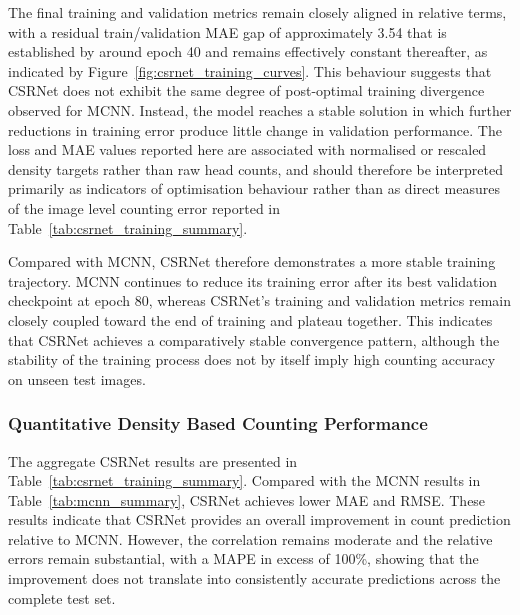 The final training and validation metrics remain closely aligned in relative terms, with a residual train/validation MAE gap of approximately 3.54 that is established by around epoch 40 and remains effectively constant thereafter, as indicated by Figure~\ref{fig:csrnet_training_curves}. This behaviour suggests that CSRNet does not exhibit the same degree of post-optimal training divergence observed for MCNN. Instead, the model reaches a stable solution in which further reductions in training error produce little change in validation performance. The loss and MAE values reported here are associated with normalised or rescaled density targets rather than raw head counts, and should therefore be interpreted primarily as indicators of optimisation behaviour rather than as direct measures of the image level counting error reported in Table~\ref{tab:csrnet_training_summary}.

Compared with MCNN, CSRNet therefore demonstrates a more stable training trajectory. MCNN continues to reduce its training error after its best validation checkpoint at epoch 80, whereas CSRNet's training and validation metrics remain closely coupled toward the end of training and plateau together. This indicates that CSRNet achieves a comparatively stable convergence pattern, although the stability of the training process does not by itself imply high counting accuracy on unseen test images.

\subsubsection{Quantitative Density Based Counting Performance}

The aggregate CSRNet results are presented in Table~\ref{tab:csrnet_training_summary}. Compared with the MCNN results in Table~\ref{tab:mcnn_summary}, CSRNet achieves lower MAE and RMSE. These results indicate that CSRNet provides an overall improvement in count prediction relative to MCNN. However, the correlation remains moderate and the relative errors remain substantial, with a MAPE in excess of 100\%, showing that the improvement does not translate into consistently accurate predictions across the complete test set.

